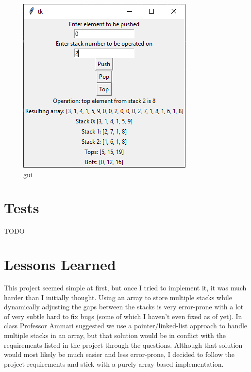 \documentclass[12pt]{report}
\begin{document}
\begin{figure}[ht]
    \centering
    \includegraphics[]{gui}
    \caption{gui}
\end{figure}


\chapter{Tests}
TODO

\chapter{Lessons Learned}
This project seemed simple at first, but once I tried to implement it,
it was much harder than I initially thought. Using an array to store multiple
stacks while dynamically adjusting the gaps between the stacks is very error-prone 
with a lot of very subtle hard to fix bugs (some of which I haven't even fixed as of yet).
In class Professor Ammari suggested we use a pointer/linked-list approach to handle
multiple stacks in an array, but that solution would be in conflict with the requirements 
listed in the project through the questions. Although that solution would most likely be much
easier and less error-prone, I decided to follow the project requirements and stick with
a purely array based implementation.



 
\end{document}
